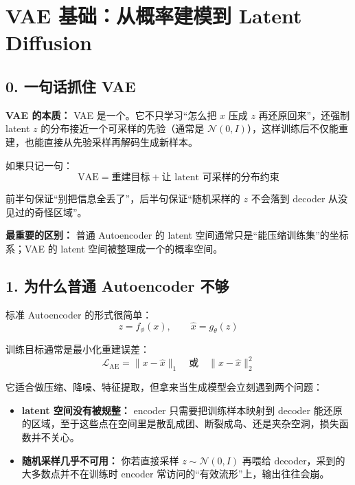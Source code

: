 
\section{VAE 基础：从概率建模到 Latent Diffusion}


\subsection{0. 一句话抓住 VAE}

\begin{conceptbox}
\textbf{VAE 的本质：} VAE 是一个。它不只学习“怎么把 $x$ 压成 $z$ 再还原回来”，还强制 latent $z$ 的分布接近一个可采样的先验（通常是 $\mathcal{N}(0,I)$），这样训练后不仅能重建，也能直接从先验采样再解码生成新样本。
\end{conceptbox}

如果只记一句：
\[
\text{VAE} = \text{重建目标} + \text{让 latent 可采样的分布约束}
\]

前半句保证“别把信息全丢了”，后半句保证“随机采样的 $z$ 不会落到 decoder 从没见过的奇怪区域”。

\begin{summarybox}
\textbf{最重要的区别：} 普通 Autoencoder 的 latent 空间通常只是“能压缩训练集”的坐标系；VAE 的 latent 空间被整理成一个的概率空间。
\end{summarybox}

\subsection{1. 为什么普通 Autoencoder 不够}

标准 Autoencoder 的形式很简单：
\[
z = f_\phi(x), \qquad \hat{x} = g_\theta(z)
\]

训练目标通常是最小化重建误差：
\[
\mathcal{L}_{\text{AE}} = \|x - \hat{x}\|_1 \quad \text{或} \quad \|x - \hat{x}\|_2^2
\]

它适合做压缩、降噪、特征提取，但拿来当生成模型会立刻遇到两个问题：

\begin{itemize}[leftmargin=1.5em]
  \item \textbf{latent 空间没有被规整：} encoder 只需要把训练样本映射到 decoder 能还原的区域，至于这些点在空间里是散乱成团、断裂成岛、还是夹杂空洞，损失函数并不关心。
  \item \textbf{随机采样几乎不可用：} 你若直接采样 $z\sim\mathcal{N}(0,I)$ 再喂给 decoder，采到的大多数点并不在训练时 encoder 常访问的“有效流形”上，输出往往会崩。
\end{itemize}

